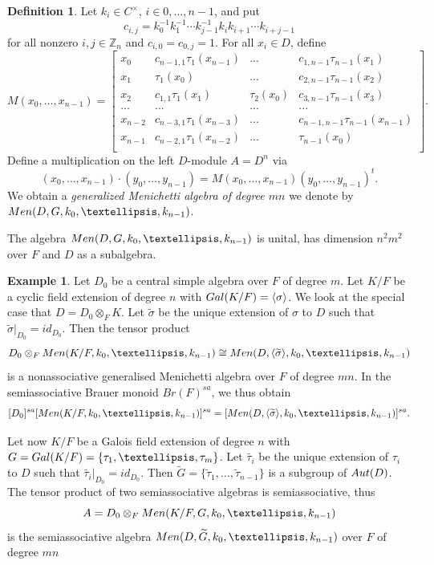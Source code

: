 \documentclass[11pt]{amsart}
\theoremstyle{plain}
\theoremstyle{definition}
\newtheorem{definition}[theorem]{Definition}
\newtheorem{example}[theorem]{Example}
\begin{document}
\begin{definition}
Let $k_i\in C^\times$, $i\in 0,\dots,{n-1}$, and put
$$c_{i,j}=k_0^{-1}k_1^{-1} \cdots    k_{j-1}^{-1}   k_ik_{i+1}\cdots k_{i+j-1}$$
for all nonzero $i,j\in \mathbb{Z}_n$ and $c_{i,0}=c_{0,j}=1$. For all $x_i\in D$, define
\[ M(x_0,\dots,x_{n-1})=\left [\begin {array}{cccccc}
x_0 &  c_{{n-1},1}\tau_1(x_{n-1}) & ... & c_{1,{n-1}} \tau_{n-1}(x_{1})\\
x_1 & \tau_1(x_0) & ... &  c_{2,{n-1}} \tau_{n-1}(x_{2})\\
x_2 & c_{1,1}\tau_1(x_{1}) & \tau_2(x_0) & c_{3,{n-1}} \tau_{n-1}(x_{3})\\
...& ...  & ... & ...\\
x_{n-2} &  c_{n-3,1}\tau_1(x_{n-3})  & ...& c_{{n-1},{n-1}} \tau_{n-1}(x_{n-1})\\
x_{n-1} &  c_{n-2,1}\tau_1(x_{n-2})  & ...& \tau_{n-1}(x_{0})\\
\end {array}\right ].\]
 Define a multiplication on the left $D$-module $A=D^n$ via
 $$(x_0,\dots,x_{n-1})\cdot  (y_0,\dots,y_{n-1})=M(x_0,\dots,x_{n-1})(y_0,\dots,y_{n-1})^t.$$
 We obtain a \emph{generalized Menichetti algebra of degree $mn$} we denote by ${\rm Men}(D, G, k_0,\dots,k_{n-1})$.
\end{definition}

The algebra ${\rm Men}(D, G, k_0,\dots,k_{n-1})$ is unital, has dimension $n^2m^2$ over $F$ and  $D$ as a subalgebra.


\begin{example}
 Let $D_0$ be a central simple algebra over $F$ of degree $m$.
Let  $K/F$ be a cyclic field extension of degree $n$  with ${\rm Gal}(K/F)=\langle \sigma\rangle$.
 We look at the special case that $D=D_0\otimes_F K$. Let $\widetilde{\sigma}$ be the unique extension of $\sigma$ to $D$ such that $\widetilde{\sigma}|_{D_0}=id_{D_0}$.
   Then the tensor product
$$D_0\otimes_F {\rm Men}(K/F, k_0,\dots,k_{n-1})\cong {\rm Men}(D, \langle\widetilde{\sigma} \rangle, k_0,\dots,k_{n-1})$$
is a nonassociative generalised Menichetti algebra
over $F$ of degree $mn$.
   In the semiassociative Brauer monoid $Br(F)^{sa}$, we thus obtain
$$[D_0]^{sa} [{\rm Men}(K/F, k_0,\dots,k_{n-1})]^{sa} =[ {\rm Men}(D,\langle \widetilde{\sigma}\rangle, k_0,\dots,k_{n-1})]^{sa}.$$
\end{example}

Let now $K/F$ be a Galois field extension of degree $n$  with $G={\rm Gal}(K/F)=\{ \tau_1,\dots,\tau_m\}$. Let $\widetilde{\tau_i}$ be the unique extension of $\tau_i$ to $D$ such that $\widetilde{\tau_i}|_{D_0}=id_{D_0}$.  Then $\widetilde{G}=\{\widetilde{\tau}_1,\dots,\widetilde{\tau}_{n-1}\}$ is a subgroup of ${\rm Aut}(D)$. The tensor product of two semiassociative algebras is semiassociative, thus
$$A=D_0\otimes_F {\rm Men}(K/F,G,  k_0,\dots,k_{n-1})$$
is the semiassociative algebra ${\rm Men}(D, \widetilde{G}, k_0,\dots,k_{n-1})$ over $F$ of degree $mn$
\end{document}
